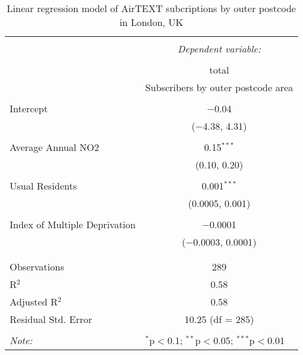 
\begin{table}[!htbp] \centering 
  \caption{Linear regression model of AirTEXT subcriptions by outer postcode in London, UK} 
  \label{} 
\begin{tabular}{@{\extracolsep{5pt}}lc} 
\\[-1.8ex]\hline 
\hline \\[-1.8ex] 
 & \multicolumn{1}{c}{\textit{Dependent variable:}} \\ 
\cline{2-2} 
\\[-1.8ex] & total \\ 
 & Subscribers by outer postcode area \\ 
\hline \\[-1.8ex] 
 Intercept & $-$0.04 \\ 
  & ($-$4.38, 4.31) \\ 
  & \\ 
 Average Annual NO2 & 0.15$^{***}$ \\ 
  & (0.10, 0.20) \\ 
  & \\ 
 Usual Residents & 0.001$^{***}$ \\ 
  & (0.0005, 0.001) \\ 
  & \\ 
 Index of Multiple Deprivation & $-$0.0001 \\ 
  & ($-$0.0003, 0.0001) \\ 
  & \\ 
\hline \\[-1.8ex] 
Observations & 289 \\ 
R$^{2}$ & 0.58 \\ 
Adjusted R$^{2}$ & 0.58 \\ 
Residual Std. Error & 10.25 (df = 285) \\ 
\hline 
\hline \\[-1.8ex] 
\textit{Note:}  & \multicolumn{1}{l}{$^{*}$p$<$0.1; $^{**}$p$<$0.05; $^{***}$p$<$0.01} \\ 
\end{tabular} 
\end{table} 
